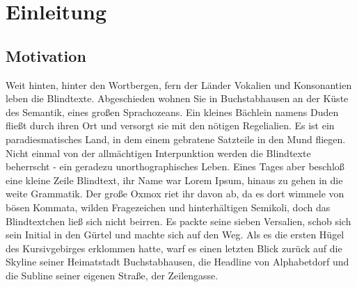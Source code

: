\documentclass[12pt,a4paper,twoside]{scrartcl}
\numberwithin{equation}{section}
\begin{document}
\tableofcontents

\clearpage


\listoffigures
\listoftables
\listofalgorithms

\clearpage


\section{Einleitung}

\subsection{Motivation}

Weit hinten, hinter den Wortbergen, fern der Länder Vokalien und Konsonantien leben die Blindtexte. Abgeschieden wohnen Sie in Buchstabhausen an der Küste des Semantik, eines großen Sprachozeans. Ein kleines Bächlein namens Duden fließt durch ihren Ort und versorgt sie mit den nötigen Regelialien. Es ist ein paradiesmatisches Land, in dem einem gebratene Satzteile in den Mund fliegen. Nicht einmal von der allmächtigen Interpunktion werden die Blindtexte beherrscht - ein geradezu unorthographisches Leben. Eines Tages aber beschloß eine kleine Zeile Blindtext, ihr Name war Lorem Ipsum, hinaus zu gehen in die weite Grammatik. Der große Oxmox riet ihr davon ab, da es dort wimmele von bösen Kommata, wilden Fragezeichen und hinterhältigen Semikoli, doch das Blindtextchen ließ sich nicht beirren. Es packte seine sieben Versalien, schob sich sein Initial in den Gürtel und machte sich auf den Weg. Als es die ersten Hügel des Kursivgebirges erklommen hatte, warf es einen letzten Blick zurück auf die Skyline seiner Heimatstadt Buchstabhausen, die Headline von Alphabetdorf und die Subline seiner eigenen Straße, der Zeilengasse.
\end{document}
